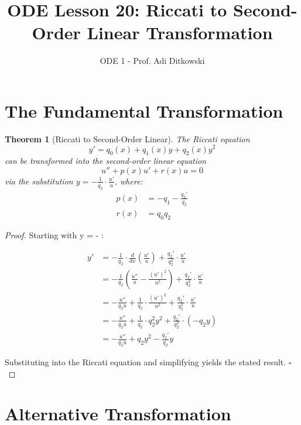 \documentclass[12pt]{article}
\title{ODE Lesson 20: Riccati to Second-Order Linear Transformation}
\author{ODE 1 - Prof. Adi Ditkowski}
\date{}
\newtheorem{theorem}{Theorem}
\begin{document}
\maketitle

\section{The Fundamental Transformation}

\begin{theorem}[Riccati to Second-Order Linear]
The Riccati equation
$$y' = q_{0}(x) + q_{1}(x)y + q_{2}(x)y^{2}$$
can be transformed into the second-order linear equation
$$u'' + p(x)u' + r(x)u = 0$$
via the substitution $y = -\frac{1}{q_{2}} \cdot \frac{u'}{u}$, where:
\begin{align}
p(x) &= -q_{1} - \frac{q_{2}'}{q_{2}} \\
r(x) &= q_{0} q_{2}
\end{align}
\end{theorem}

\begin{proof}
Starting with y = - \cdot {}:

\begin{align}
y' &= -\frac{1}{q_{2}} \cdot \frac{d}{dx}\left(\frac{u'}{u}\right) + \frac{q_{2}'}{q_{2}^2} \cdot \frac{u'}{u} \\
&= -\frac{1}{q_{2}}\left(\frac{u''}{u} - \frac{(u')^{2}}{u^{2}}\right) + \frac{q_{2}'}{q_{2}^2} \cdot \frac{u'}{u} \\
&= -\frac{u''}{q_{2} u} + \frac{1}{q_{2}} \cdot \frac{(u')^{2}}{u^{2}} + \frac{q_{2}'}{q_{2}^2} \cdot \frac{u'}{u} \\
&= -\frac{u''}{q_{2} u} + \frac{1}{q_{2}} \cdot q_{2}^2 y^{2} + \frac{q_{2}'}{q_{2}^2} \cdot (-q_{2} y) \\
&= -\frac{u''}{q_{2} u} + q_{2} y^{2} - \frac{q_{2}'}{q_{2}} y
\end{align}

Substituting into the Riccati equation and simplifying yields the stated result. $\square$
\end{proof}

\section{Alternative Transformation}
\end{document}
